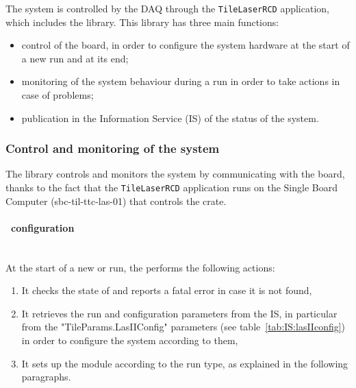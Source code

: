 

The \lasii{} system is controlled by the \atlas{} DAQ through the {\tt TileLaserRCD} application,
which includes the \lasmodule{} library. This library has three main functions:
\begin{itemize}
\item control of the \lascar{} \vme{} board, in order to configure the \lasii{} system
hardware at the start of a new run and at its end;
\item monitoring of the \lasii{} system behaviour during a run in order to take actions in
case of problems;
\item publication in the Information Service (IS) of the status of the \lasii{} system.
\end{itemize}

\subsubsection{Control and monitoring of the system}
The \lasmodule{} library controls and monitors the \lasii{} system by communicating with the
\lascar{} board, thanks to the fact that the {\tt TileLaserRCD} application runs on the
Single Board Computer (sbc-til-ttc-las-01) that controls the \lasii{} \vme{} crate.

\paragraph{\lascar~configuration}
~~\\
At the start of a new \atlas{} or \tilecal{} run, the \lasmodule{} performs the following
actions:
\begin{enumerate}
\item It checks the state of \lascar{} and reports a fatal error in case it is not found,
\item It retrieves the run and configuration parameters from the IS, in particular
from the "TileParams.LasIIConfig" parameters (see table~\ref{tab:IS:lasIIconfig}) in order to configure the \lasii{}
system according to them,
\item It sets up the \lascar{} module according to the run type, as explained
in the following paragraphs.
\end{enumerate}

